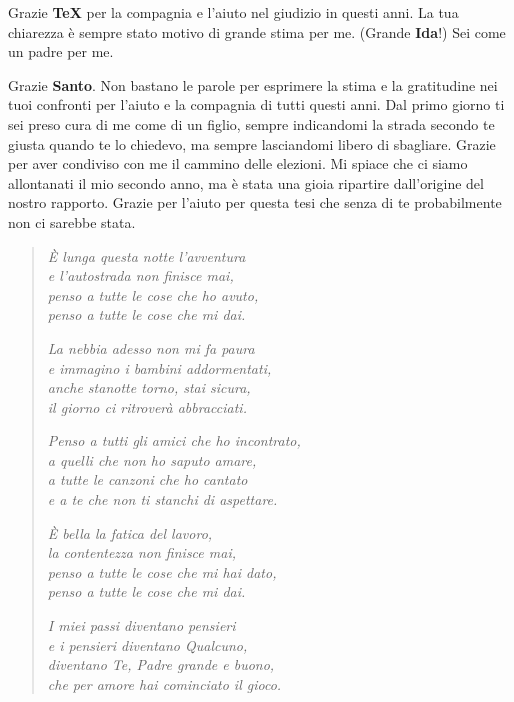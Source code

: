 Grazie \textbf{\TeX} per la compagnia e l'aiuto nel giudizio in questi anni. La tua chiarezza è sempre stato motivo di grande stima per me. (Grande \textbf{Ida}!) Sei come un padre per me.

Grazie \textbf{Santo}. Non bastano le parole per esprimere la stima e la gratitudine nei tuoi confronti per l'aiuto e la compagnia di tutti questi anni. Dal primo giorno ti sei preso cura di me come di un figlio, sempre indicandomi la strada secondo te giusta quando te lo chiedevo, ma sempre lasciandomi libero di sbagliare. Grazie per aver condiviso con me il cammino delle elezioni. Mi spiace che ci siamo allontanati il mio secondo anno, ma è stata una gioia ripartire dall'origine del nostro rapporto. Grazie per l'aiuto per questa tesi che senza di te probabilmente non ci sarebbe stata.

\begin{verse}
    \textit{È lunga questa notte l'avventura \\
    e l'autostrada non finisce mai, \\
    penso a tutte le cose che ho avuto, \\
    penso a tutte le cose che mi dai.}
    
    \textit{La nebbia adesso non mi fa paura \\
    e immagino i bambini addormentati, \\
    anche stanotte torno, stai sicura, \\
    il giorno ci ritroverà abbracciati.}
    
    \textit{Penso a tutti gli amici che ho incontrato, \\
    a quelli che non ho saputo amare, \\
    a tutte le canzoni che ho cantato \\
    e a te che non ti stanchi di aspettare.}
    
    \textit{È bella la fatica del lavoro, \\
    la contentezza non finisce mai, \\
    penso a tutte le cose che mi hai dato, \\
    penso a tutte le cose che mi dai.}
    
    \textit{I miei passi diventano pensieri \\
    e i pensieri diventano Qualcuno, \\
    diventano Te, Padre grande e buono, \\
    che per amore hai cominciato il gioco.}
    

\end{verse}
